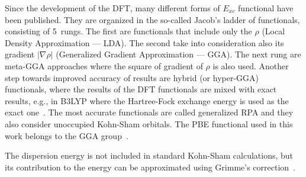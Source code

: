 Since the development of the DFT, many different forms of $E_{xc}$ functional have been published. They are organized in the so-called Jacob's ladder of functionals, consisting of 5~rungs. The first are functionals that include only the $\rho$ (Local Density Approximation --- LDA). The second take into consideration also its gradient $|\nabla \rho|$ (Generalized Gradient Approximation --- GGA). The next rung are meta-GGA approaches where the square of gradient of $\rho$ is also used. Another step towards improved accuracy of results are hybrid (or hyper-GGA) functionals, where the results of the DFT functionals are mixed with exact results, e.g., in B3LYP where the Hartree-Fock exchange energy is used as the exact one~\cite{b3lyp-1,b3lyp-2,b3lyp-3,b3lyp-4}. The most accurate functionals are called generalized RPA and they also consider unoccupied Kohn-Sham orbitals. The PBE functional used in this work belongs to the GGA group~\cite{pbe-1,pbe-2,pbe-3,pbe-4}.

The dispersion energy is not included in standard Kohn-Sham calculations, but its contribution to the energy can be approximated using Grimme's correction~\cite{grimme-d3}.